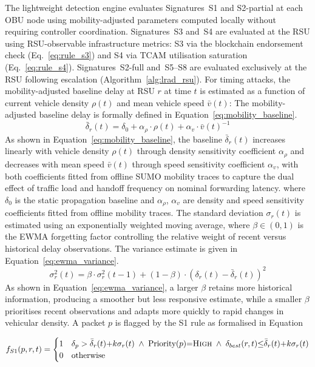 \documentclass[12pt, a4paper]{report}
\begin{document}
The lightweight detection engine evaluates Signatures~S1
and S2-partial at each \ac{OBU} node using
mobility-adjusted parameters computed locally without
requiring controller coordination. Signatures~S3 and~S4
are evaluated at the \ac{RSU} using \ac{RSU}-observable
infrastructure metrics: S3 via the blockchain endorsement
check (Eq.~\ref{eq:rule_s3}) and S4 via \ac{TCAM}
utilisation saturation (Eq.~\ref{eq:rule_s4}). Signatures~S2-full
and~S5--S8 are evaluated exclusively at the \ac{RSU}
following escalation (Algorithm~\ref{alg:lrad_rsu}). For timing attacks, the
mobility-adjusted baseline delay at RSU $r$ at time $t$ is estimated
as a function of current vehicle density $\rho(t)$ and mean vehicle
speed $\bar{v}(t)$:
The mobility-adjusted baseline delay is formally defined in
Equation~\eqref{eq:mobility_baseline}.
\begin{equation}
\bar{\delta}_r(t) = \delta_0 + \alpha_\rho \cdot \rho(t) + \alpha_v \cdot \bar{v}(t)^{-1}
\label{eq:mobility_baseline}
\end{equation}
As shown in Equation~\eqref{eq:mobility_baseline}, the baseline
$\bar{\delta}_r(t)$ increases linearly with vehicle density $\rho(t)$
through density sensitivity coefficient $\alpha_\rho$ and decreases with mean speed
$\bar{v}(t)$ through speed sensitivity coefficient $\alpha_v$, with both coefficients
fitted from offline SUMO mobility traces to capture the dual effect of
traffic load and handoff frequency on nominal forwarding latency.
where $\delta_0$ is the static propagation baseline and $\alpha_\rho$,
$\alpha_v$ are density and speed sensitivity coefficients fitted from
offline mobility traces. The standard deviation $\sigma_r(t)$ is
estimated using an exponentially weighted moving average,
where $\beta \in (0,1)$ is the EWMA forgetting factor controlling
the relative weight of recent versus historical delay observations.
The variance estimate is given in Equation~\eqref{eq:ewma_variance}.
\begin{equation}
\sigma_r^2(t) = \beta \cdot \sigma_r^2(t-1)
+ (1-\beta)\cdot\left(\delta_r(t) - \bar{\delta}_r(t)\right)^2
\label{eq:ewma_variance}
\end{equation}
As shown in Equation~\eqref{eq:ewma_variance}, a larger $\beta$
retains more historical information, producing a smoother but less
responsive estimate, while a smaller $\beta$ prioritises recent
observations and adapts more quickly to rapid changes in vehicular
density.
A packet $p$ is flagged by the S1 rule as formalised in
Equation

\begin{equation}
f_{S1}(p,r,t) =
\begin{cases}
1 & \delta_p > \bar{\delta}_r(t){+}k\sigma_r(t)
    \;\land\; \text{Priority}(p){=}\textsc{High}
    \;\land\; \delta_{best}(r,t){\leq}
    \bar{\delta}_r(t){+}k\sigma_r(t) \\
0 & \text{otherwise}
\end{cases}
\label{eq:rule_s1}
\end{equation}
\end{document}
